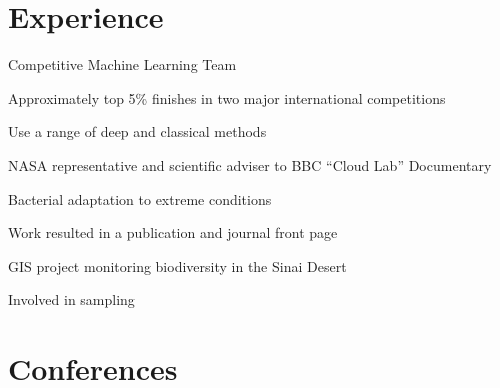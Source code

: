 \documentclass[]{Finlay_Maguire_CV}
\begin{document}
\begin{minipage}[t]{0.66\textwidth} 


\section{Experience}
\sectionsep

\vspace{\topsep} %
\begin{tightemize}
\item Competitive Machine Learning Team
\item Approximately top 5\% finishes in two major international competitions
\item Use a range of deep and classical methods
\end{tightemize}
\sectionsep

\begin{tightemize}
\item NASA representative and scientific adviser to BBC ``Cloud Lab'' Documentary
\item Bacterial adaptation to extreme conditions
\item Work resulted in a publication and journal front page
\end{tightemize}
\sectionsep

\begin{tightemize}
\item GIS project monitoring biodiversity in the Sinai Desert
\item Involved in sampling
\end{tightemize}
\sectionsep


\section{Conferences}


\end{minipage}
\end{document}
